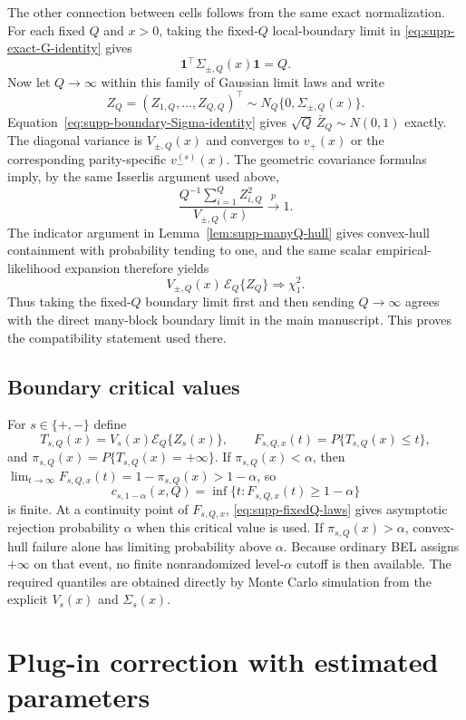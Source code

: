 \documentclass[12pt]{article}
\theoremstyle{remark}
\begin{document}
The other connection between cells follows from the same exact normalization. For each fixed $Q$ and $x>0$, taking the fixed-$Q$ local-boundary limit in \eqref{eq:supp-exact-G-identity} gives
\begin{equation}
\mathbf1^\top\Sigma_{\pm,Q}(x)\mathbf1=Q.
\label{eq:supp-boundary-Sigma-identity}
\end{equation}
Now let $Q\to\infty$ within this family of Gaussian limit laws and write
\[
Z_{Q}=(Z_{1,Q},\ldots,Z_{Q,Q})^\top\sim N_Q\{0,\Sigma_{\pm,Q}(x)\}.
\]
Equation~\eqref{eq:supp-boundary-Sigma-identity} gives $\sqrt Q\,\bar Z_Q\sim N(0,1)$ exactly. The diagonal variance is $V_{\pm,Q}(x)$ and converges to $v_+(x)$ or the corresponding parity-specific $v_-^{(s)}(x)$. The geometric covariance formulas imply, by the same Isserlis argument used above,
\[
\frac{Q^{-1}\sum_{i=1}^QZ_{i,Q}^2}{V_{\pm,Q}(x)}\xrightarrow{p}1.
\]
The indicator argument in Lemma~\ref{lem:supp-manyQ-hull} gives convex-hull containment with probability tending to one, and the same scalar empirical-likelihood expansion therefore yields
\begin{equation*}
V_{\pm,Q}(x)\,\mathcal E_Q\{Z_Q\}
\Rightarrow\chi_1^2.
\end{equation*}
Thus taking the fixed-$Q$ boundary limit first and then sending $Q\to\infty$ agrees with the direct many-block boundary limit in the main manuscript. This proves the compatibility statement used there.

\subsection{Boundary critical values}
For $s\in\{+,-\}$ define
\[
T_{s,Q}(x)=V_s(x)\mathcal E_Q\{Z_s(x)\},
\qquad
F_{s,Q,x}(t)=P\{T_{s,Q}(x)\le t\},
\]
and $\pi_{s,Q}(x)=P\{T_{s,Q}(x)=+\infty\}$. If $\pi_{s,Q}(x)<\alpha$, then $\lim_{t\to\infty}F_{s,Q,x}(t)=1-\pi_{s,Q}(x)>1-\alpha$, so
\[
c_{s,1-\alpha}(x,Q)=\inf\{t:F_{s,Q,x}(t)\ge1-\alpha\}
\]
is finite. At a continuity point of $F_{s,Q,x}$, \eqref{eq:supp-fixedQ-laws} gives asymptotic rejection probability $\alpha$ when this critical value is used. If $\pi_{s,Q}(x)>\alpha$, convex-hull failure alone has limiting probability above $\alpha$. Because ordinary BEL assigns $+\infty$ on that event, no finite nonrandomized level-$\alpha$ cutoff is then available. The required quantiles are obtained directly by Monte Carlo simulation from the explicit $V_s(x)$ and $\Sigma_s(x)$.

\section{Plug-in correction with estimated parameters}
\label{supp:plugin}
\end{document}
